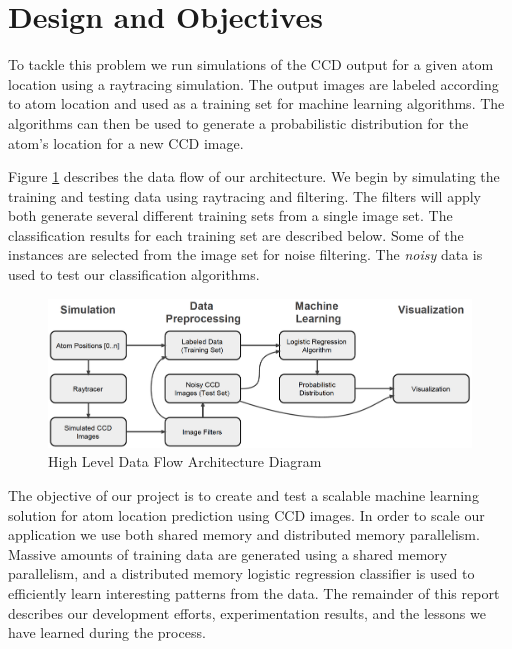 \section{Design and Objectives}

To tackle this problem we run simulations of the CCD output for a given atom location using a raytracing simulation.  The output images are labeled according to atom location and used as a training set for machine learning algorithms.  The algorithms can then be used to generate a probabilistic distribution for the atom's location for a new CCD image.  

Figure \ref{fig:arch} describes the data flow of our architecture.  We begin by simulating the training and testing data using raytracing and filtering.  The filters will apply both generate several different training sets from a single image set.  The classification results for each training set are described below.  Some of the instances are selected from the image set for noise filtering.  The \emph{noisy} data is used to test our classification algorithms.

\begin{figure}[h]
\begin{center}
\includegraphics[scale=0.4]{arch.png}
\caption{High Level Data Flow Architecture Diagram}
\label{fig:arch}
\end{center}
\end{figure}

The objective of our project is to create and test a scalable machine learning solution for atom location prediction using CCD images.  In order to scale our application we use both shared memory and distributed memory parallelism.  Massive amounts of training data are generated using a shared memory parallelism, and a distributed memory logistic regression classifier is used to efficiently learn interesting patterns from the data.  The remainder of this report describes our development efforts, experimentation results, and the lessons we have learned during the process.